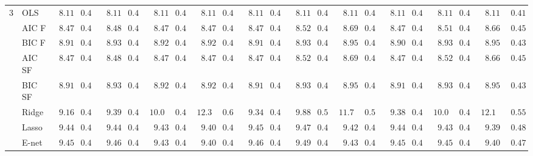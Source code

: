 \begin{tabular}{ll|ll|llllll|llllll|llllll}
3 & OLS  & $\phantom{0}8.11$ & $0.41$ & $\phantom{0}8.11$ & $0.41$ & $\phantom{0}8.11$ & $0.41$ & $\phantom{0}8.11$ & $0.41$ & $\phantom{0}8.11$ & $0.41$ & $\phantom{0}8.11$ & $0.41$ & $\phantom{0}8.11$ & $0.41$ & $\phantom{0}8.11$ & $0.41$ & $\phantom{0}8.11$ & $0.41$ & $\phantom{0}8.11$ & $\phantom{0}0.41$ \\
 & AIC F  & $\phantom{0}8.47$ & $0.43$ & $\phantom{0}8.48$ & $0.43$ & $\phantom{0}8.47$ & $0.43$ & $\phantom{0}8.47$ & $0.44$ & $\phantom{0}8.47$ & $0.44$ & $\phantom{0}8.52$ & $0.45$ & $\phantom{0}8.69$ & $0.46$ & $\phantom{0}8.47$ & $0.43$ & $\phantom{0}8.51$ & $0.43$ & $\phantom{0}8.66$ & $\phantom{0}0.45$ \\
 & BIC F  & $\phantom{0}8.91$ & $0.45$ & $\phantom{0}8.93$ & $0.44$ & $\phantom{0}8.92$ & $0.44$ & $\phantom{0}8.92$ & $0.43$ & $\phantom{0}8.91$ & $0.45$ & $\phantom{0}8.93$ & $0.44$ & $\phantom{0}8.95$ & $0.43$ & $\phantom{0}8.90$ & $0.43$ & $\phantom{0}8.93$ & $0.44$ & $\phantom{0}8.95$ & $\phantom{0}0.43$ \\
 & AIC SF  & $\phantom{0}8.47$ & $0.43$ & $\phantom{0}8.48$ & $0.42$ & $\phantom{0}8.47$ & $0.43$ & $\phantom{0}8.47$ & $0.44$ & $\phantom{0}8.47$ & $0.44$ & $\phantom{0}8.52$ & $0.45$ & $\phantom{0}8.69$ & $0.47$ & $\phantom{0}8.47$ & $0.43$ & $\phantom{0}8.52$ & $0.43$ & $\phantom{0}8.66$ & $\phantom{0}0.45$ \\
 & BIC SF  & $\phantom{0}8.91$ & $0.45$ & $\phantom{0}8.93$ & $0.44$ & $\phantom{0}8.92$ & $0.44$ & $\phantom{0}8.92$ & $0.43$ & $\phantom{0}8.91$ & $0.45$ & $\phantom{0}8.93$ & $0.44$ & $\phantom{0}8.95$ & $0.43$ & $\phantom{0}8.91$ & $0.43$ & $\phantom{0}8.93$ & $0.44$ & $\phantom{0}8.95$ & $\phantom{0}0.43$ \\
 & Ridge  & $\phantom{0}9.16$ & $0.48$ & $\phantom{0}9.39$ & $0.46$ & $10.09$ & $0.44$ & $12.30$ & $0.62$ & $\phantom{0}9.34$ & $0.47$ & $\phantom{0}9.88$ & $0.51$ & $11.73$ & $0.55$ & $\phantom{0}9.38$ & $0.44$ & $10.03$ & $0.48$ & $12.16$ & $\phantom{0}0.55$ \\
 & Lasso  & $\phantom{0}9.44$ & $0.47$ & $\phantom{0}9.44$ & $0.47$ & $\phantom{0}9.43$ & $0.48$ & $\phantom{0}9.40$ & $0.48$ & $\phantom{0}9.45$ & $0.48$ & $\phantom{0}9.47$ & $0.48$ & $\phantom{0}9.42$ & $0.49$ & $\phantom{0}9.44$ & $0.48$ & $\phantom{0}9.43$ & $0.48$ & $\phantom{0}9.39$ & $\phantom{0}0.48$ \\
 & E-net  & $\phantom{0}9.45$ & $0.48$ & $\phantom{0}9.46$ & $0.47$ & $\phantom{0}9.43$ & $0.48$ & $\phantom{0}9.40$ & $0.48$ & $\phantom{0}9.46$ & $0.49$ & $\phantom{0}9.49$ & $0.48$ & $\phantom{0}9.43$ & $0.49$ & $\phantom{0}9.45$ & $0.48$ & $\phantom{0}9.45$ & $0.48$ & $\phantom{0}9.40$ & $\phantom{0}0.47$ \\

\end{tabular}
